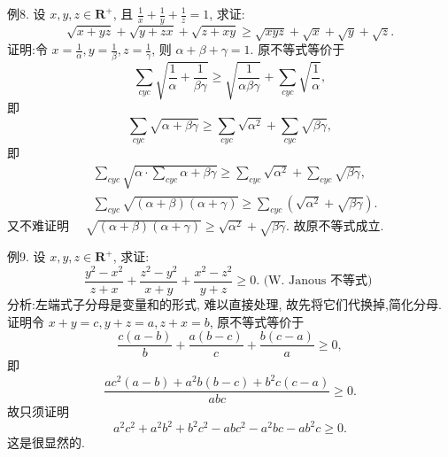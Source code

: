 例8. 设 $x, y, z \in \mathbf{R}^{+}$, 且 $\frac{1}{x}+\frac{1}{y}+\frac{1}{z}=1$, 求证:
$$
\sqrt{x+y z}+\sqrt{y+z x}+\sqrt{z+x y} \geqslant \sqrt{x y z}+\sqrt{x}+\sqrt{y}+\sqrt{z} .
$$
证明:令 $x=\frac{1}{\alpha}, y=\frac{1}{\beta}, z=\frac{1}{\gamma}$, 则 $\alpha+\beta+\gamma=1$.
原不等式等价于
$$
\sum_{c y c} \sqrt{\frac{1}{\alpha}+\frac{1}{\beta \gamma}} \geqslant \sqrt{\frac{1}{\alpha \beta \gamma}}+\sum_{c y c} \sqrt{\frac{1}{\alpha}},
$$
即
$$
\sum_{c y c} \sqrt{\alpha+\beta \gamma} \geqslant \sum_{c y c} \sqrt{\alpha^2}+\sum_{c y c} \sqrt{\beta \gamma},
$$
即
$$
\begin{aligned}
& \sum_{c y c} \sqrt{\alpha \cdot \sum_{c y c} \alpha+\beta \gamma} \geqslant \sum_{c y c} \sqrt{\alpha^2}+\sum_{c y c} \sqrt{\beta \gamma}, \\
& \sum_{c y c} \sqrt{(\alpha+\beta)(\alpha+\gamma)} \geqslant \sum_{c y c}\left(\sqrt{\alpha^2}+\sqrt{\beta \gamma}\right) .
\end{aligned}
$$
又不难证明 $\quad \sqrt{(\alpha+\beta)(\alpha+\gamma)} \geqslant \sqrt{\alpha^2}+\sqrt{\beta \gamma}$.
故原不等式成立.



例9. 设 $x, y, z \in \mathbf{R}^{+}$, 求证:
$$
\frac{y^2-x^2}{z+x}+\frac{z^2-y^2}{x+y}+\frac{x^2-z^2}{y+z} \geqslant 0 \text {. (W. Janous 不等式) }
$$
分析:左端式子分母是变量和的形式, 难以直接处理, 故先将它们代换掉,简化分母.
证明令 $x+y=c, y+z=a, z+x=b$, 原不等式等价于
$$
\frac{c(a-b)}{b}+\frac{a(b-c)}{c}+\frac{b(c-a)}{a} \geqslant 0,
$$
即
$$
\frac{a c^2(a-b)+a^2 b(b-c)+b^2 c(c-a)}{a b c} \geqslant 0 .
$$
故只须证明
$$
a^2 c^2+a^2 b^2+b^2 c^2-a b c^2-a^2 b c-a b^2 c \geqslant 0 .
$$
这是很显然的.



